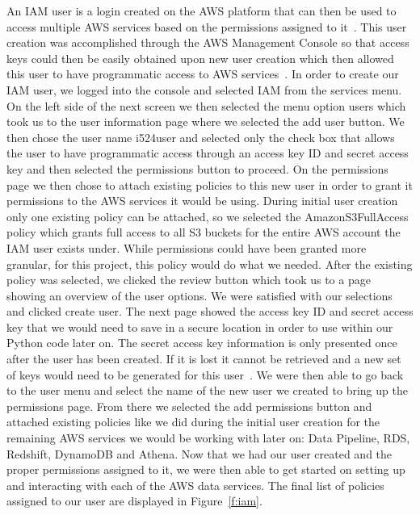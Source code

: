 An IAM user is a login created on the AWS platform that can then be used to 
access multiple AWS services based on the permissions assigned to 
it~\cite{hid-sp18-521-IAMOverview}. This user creation was accomplished 
through the AWS Management Console so that access keys could then be easily 
obtained upon new user creation which then allowed this user to have 
programmatic access to AWS services~\cite{hid-sp18-521-IAMkeys}. In order to 
create our IAM user, we logged into the console and selected IAM from the 
services menu. On the left side of the next screen we then selected the menu 
option users which took us to the user information page where we selected the 
add user button. We then chose the user name i524user and selected only the 
check box that allows the user to have programmatic access through an access 
key ID and secret access key and then selected the permissions button to 
proceed. On the permissions page we then chose to attach existing policies to 
this new user in order to grant it permissions to the AWS services it would be 
using. During initial user creation only one existing policy can be attached, 
so we selected the AmazonS3FullAccess policy which grants full access to all 
S3 buckets for the entire AWS account the IAM user exists under. While 
permissions could have been granted more granular, for this project, this 
policy would do what we needed. After the existing policy was selected, we 
clicked the review button which took us to a page showing an overview of the 
user options. We were satisfied with our selections and clicked create user. 
The next page showed the access key ID and secret access key that we would 
need to save in a secure location in order to use within our Python code later 
on. The secret access key information is only presented once after the user 
has been created. If it is lost it cannot be retrieved and a new set of keys 
would need to be generated for this user~\cite{hid-sp18-521-IAMkeys}. We were 
then able to go back to the user menu and select the name of the new user we 
created to bring up the permissions page. From there we selected the add 
permissions button and attached existing policies like we did during the 
initial user creation for the remaining AWS services we would be working with 
later on: Data Pipeline, RDS, Redshift, DynamoDB and Athena. Now that we had 
our user created and the proper permissions assigned to it, we were then able 
to get started on setting up and interacting with each of the AWS data 
services. The final list of policies assigned to our user are displayed in
Figure~\ref{f:iam}.

